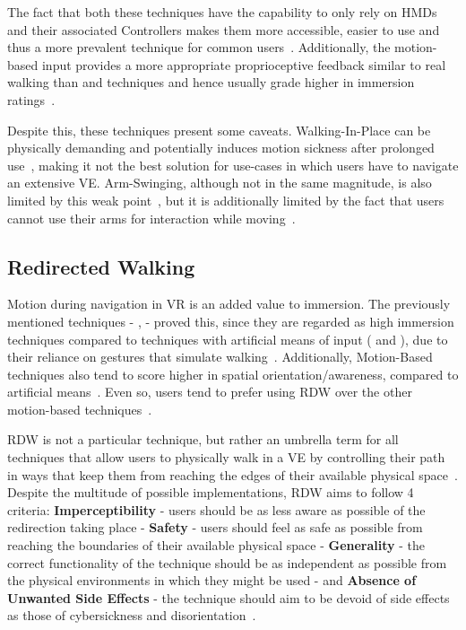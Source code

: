 The fact that both these techniques have the capability to only rely on \glspl{HMD} and their associated 
Controllers makes them more accessible, easier to use and thus a more prevalent technique 
for common users~\cite{Nilsson2018}. Additionally, the motion-based input provides a more appropriate proprioceptive feedback 
similar to real walking than  and  
techniques and hence usually grade higher in immersion ratings~\cite{Boletsis2019}. 

Despite this, these techniques present some caveats. Walking-In-Place can be physically demanding and potentially 
induces motion sickness after prolonged use~\cite{Boletsis2019,Cherni2020}, making it not the best solution for use-cases 
in which users have to navigate an extensive \gls{VE}. Arm-Swinging, although not in the same magnitude, is also limited by this 
weak point~\cite{Coomer2018}, but it is additionally limited by the fact that users cannot use their arms for interaction 
while moving~\cite{Nilsson2018}. 

\subsection{Redirected Walking}
\label{sec:redirected-walking}

Motion during navigation in \gls{VR} is an added value to immersion. The previously mentioned techniques - ,  
 - proved this, since they are regarded as high immersion techniques compared to techniques with artificial means of 
input ( and ), due to their reliance on gestures that simulate walking~\cite{Nasiri2023}.
Additionally, Motion-Based techniques also tend to score higher in spatial orientation/awareness, compared to artificial means~\cite{Cherni2020,Coomer2018}.
Even so, users tend to prefer using \gls{RDW} over the other motion-based techniques~\cite{Langbehn2018, Syamil2024}.

\gls{RDW} is not a particular technique, but rather an umbrella term for all techniques that allow users to physically walk in a 
\gls{VE} by controlling their path in ways that keep them from reaching the edges of their available physical space~\cite{Nilsson2018}. 
Despite the multitude of possible implementations, \gls{RDW} aims to follow 4 criteria: \textbf{Imperceptibility} - users should be as less aware 
as possible of the redirection taking place - \textbf{Safety} - users should feel as safe as possible from reaching the boundaries of their 
available physical space - \textbf{Generality} - the correct functionality of the technique should be as independent as possible from the physical 
environments in which they might be used - and \textbf{Absence of Unwanted Side Effects} - the technique should aim to be devoid of 
side effects as those of cybersickness and disorientation~\cite{8255772}.

